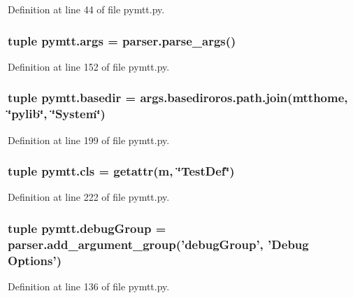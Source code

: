 Definition at line 44 of file pymtt.\-py.

\hypertarget{namespacepymtt_af7633cc372f3357c4f8e6f8dedfe7a8e}{
\subsubsection[{args}]{\setlength{\rightskip}{0pt plus 5cm}tuple pymtt.\-args = parser.\-parse\-\_\-args()}}\label{namespacepymtt_af7633cc372f3357c4f8e6f8dedfe7a8e}


Definition at line 152 of file pymtt.\-py.

\hypertarget{namespacepymtt_a57729393cfbd99464570d7fa5ad9fa05}{
\subsubsection[{basedir}]{\setlength{\rightskip}{0pt plus 5cm}tuple pymtt.\-basedir = args.\-basediroros.\-path.\-join({\bf mtthome}, \char`\"{}pylib\char`\"{}, \char`\"{}System\char`\"{})}}\label{namespacepymtt_a57729393cfbd99464570d7fa5ad9fa05}


Definition at line 199 of file pymtt.\-py.

\hypertarget{namespacepymtt_a17f658b5d141d51664bb3ede8830c4c0}{
\subsubsection[{cls}]{\setlength{\rightskip}{0pt plus 5cm}tuple pymtt.\-cls = getattr({\bf m}, \char`\"{}Test\-Def\char`\"{})}}\label{namespacepymtt_a17f658b5d141d51664bb3ede8830c4c0}


Definition at line 222 of file pymtt.\-py.

\hypertarget{namespacepymtt_af066a010075617c13a5595243ceb9041}{
\subsubsection[{debug\-Group}]{\setlength{\rightskip}{0pt plus 5cm}tuple pymtt.\-debug\-Group = parser.\-add\-\_\-argument\-\_\-group('debug\-Group', 'Debug Options')}}\label{namespacepymtt_af066a010075617c13a5595243ceb9041}


Definition at line 136 of file pymtt.\-py.

